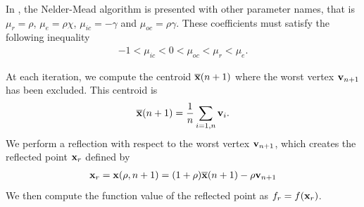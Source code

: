 In \cite{Kelley1999}, the Nelder-Mead algorithm is presented with 
other parameter names, that is $\mu_r = \rho$, $\mu_e = \rho\chi$, $\mu_{ic} = -\gamma$
and $\mu_{oc} = \rho\gamma$. These coefficients must satisfy the following 
inequality 
\begin{eqnarray}
-1 < \mu_{ic} < 0 < \mu_{oc} < \mu_r < \mu_e.
\end{eqnarray}

At each iteration, we compute the centroid 
$\overline{\mathbf{x}} (n+1)$ where the worst vertex $\mathbf{v}_{n+1}$ 
has been excluded. This centroid is 
\begin{eqnarray}
\label{nm-centroid-worst}
\overline{\mathbf{x}} (n+1) = \frac{1}{n} \sum_{i=1,n} \mathbf{v}_i.
\end{eqnarray}
We perform a reflection with respect to the worst vertex $\mathbf{v}_{n+1}$,
which creates the reflected point $\mathbf{x}_r$ defined by 
\begin{eqnarray}
\label{nm-interpolate-worst}
\mathbf{x}_r = \mathbf{x}(\rho,n+1) = (1+\rho)\overline{\mathbf{x}}(n+1) - \rho \mathbf{v}_{n+1}
\end{eqnarray}
We then compute the function value of the reflected
point as $f_r=f(\mathbf{x}_r)$. 

